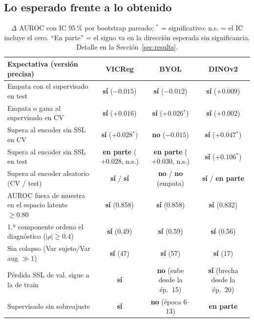 \documentclass[11pt,a4paper]{article}
\newcommand{\si}{\textcolor{okc}{\textbf{sí}}}
\newcommand{\no}{\textcolor{noc}{\textbf{no}}}
\newcommand{\parcial}{\textcolor{midc}{\textbf{en parte}}}
\newcommand{\sig}{$^{*}$}
\begin{document}
\subsection{Lo esperado frente a lo obtenido}

\begin{table}[H]
\centering
\small
\begin{tabularx}{\textwidth}{>{\raggedright\arraybackslash}X ccc}
\toprule
Expectativa (versión precisa) & \textcolor{vicregc}{\textbf{VICReg}} & \textcolor{byolc}{\textbf{BYOL}} & \textcolor{dinoc}{\textbf{DINOv2}} \\
\midrule
Empata con el supervisado en test & \si{} ($-0.015$) & \si{} ($-0.012$) & \si{} ($+0.009$) \\
Empata o gana al supervisado en CV & \si{} ($+0.016$) & \si{} ($+0.026$\sig) & \si{} ($+0.002$) \\
Supera al encoder sin SSL en CV & \si{} ($+0.028$\sig) & \no{} ($-0.015$) & \si{} ($+0.047$\sig) \\
Supera al encoder sin SSL en test & \parcial{} ($+0.028$, n.s.) & \parcial{} ($+0.030$, n.s.) & \si{} ($+0.106$\sig) \\
Supera al encoder aleatorio (CV / test) & \si{} / \si{} & \no{} / \no{} (empata) & \si{} / \parcial{} \\
AUROC fuera de muestra en el espacio latente $\geq0.80$ & \si{} (0.858) & \si{} (0.858) & \si{} (0.832) \\
1.ª componente ordena el diagnóstico ($|\rho|\geq0.4$) & \si{} (0.49) & \si{} (0.59) & \si{} (0.56) \\
Sin colapso (Var sujeto/Var aug $\gg1$) & \si{} (47) & \si{} (57) & \si{} (17) \\
Pérdida SSL de val. sigue a la de train & \si{} & \no{} (sube desde la ép.\ 15) & \si{} (brecha desde la ép.\ 20) \\
Supervisado sin sobreajuste & \si{} & \no{} (época 6--13) & \parcial{} \\
\bottomrule
\end{tabularx}
\caption{$\Delta$ AUROC con IC 95\,\% por bootstrap pareado; \sig{} = significativo; n.s. = el IC
incluye el cero. ``En parte'' = el signo va en la dirección esperada sin significancia. Detalle en la
Sección~\ref{sec:results}.}
\label{tab:scorecard}
\end{table}
\end{document}

